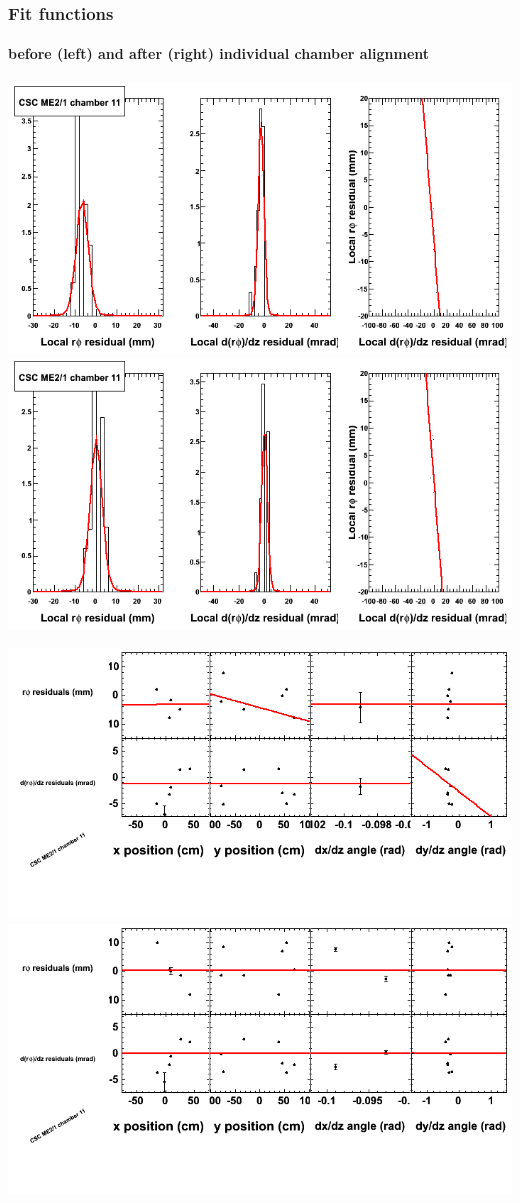 \documentclass[compress]{beamer}
\begin{document}
\begin{frame}
\frametitle{Fit functions}
\framesubtitle{before (left) and after (right) individual chamber alignment}
\includegraphics[width=0.5\linewidth]{ringfits_3dof/beforefit_MEp21_11_bellcurve.png} \includegraphics[width=0.5\linewidth]{ringfits_3dof/afterfit_MEp21_11_bellcurve.png}

\includegraphics[width=0.5\linewidth]{ringfits_3dof/beforefit_MEp21_11_polynomials.png} \includegraphics[width=0.5\linewidth]{ringfits_3dof/afterfit_MEp21_11_polynomials.png}
\end{frame}
\end{document}
